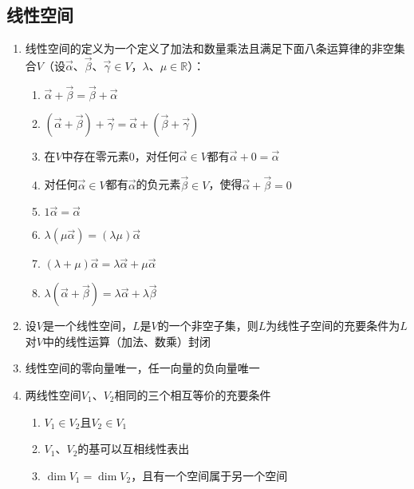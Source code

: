 \documentclass[12pt,a4paper,UTF8]{book}
\begin{document}
\subsection{线性空间}
\begin{enumerate}
\item 线性空间的定义为一个定义了加法和数量乘法且满足下面八条运算律的非空集合$V$（设$\vec{\alpha}$、$\vec{\beta}$、$\vec{\gamma}\in V$，$\lambda$、$\mu\in\mathbb{R}$）：
\begin{enumerate}
\item $\vec{\alpha}+\vec{\beta}=\vec{\beta}+\vec{\alpha}$
\item $\left(\vec{\alpha}+\vec{\beta}\right)+\vec{\gamma}=\vec{\alpha}+\left(\vec{\beta}+\vec{\gamma}\right)$
\item 在$V$中存在零元素$0$，对任何$\vec{\alpha}\in V$都有$\vec{\alpha}+0=\vec{\alpha}$
\item 对任何$\vec{\alpha}\in V$都有$\vec{\alpha}$的负元素$\vec{\beta}\in V$，使得$\vec{\alpha}+\vec{\beta}=0$
\item $1\vec{\alpha}=\vec{\alpha}$
\item $\lambda\left(\mu\vec{\alpha}\right)=\left(\lambda\mu\right)\vec{\alpha}$
\item $\left(\lambda+\mu\right)\vec{\alpha}=\lambda\vec{\alpha}+\mu\vec{\alpha}$
\item $\lambda\left(\vec{\alpha}+\vec{\beta}\right)=\lambda\vec{\alpha}+\lambda\vec{\beta}$
\end{enumerate}
\item 设$V$是一个线性空间，$L$是$V$的一个非空子集，则$L$为线性子空间的充要条件为$L$对$V$中的线性运算（加法、数乘）封闭
\item 线性空间的零向量唯一，任一向量的负向量唯一
\item 两线性空间$V_1$、$V_2$相同的三个相互等价的充要条件
\begin{enumerate}
\item $V_1\in V_2$且$V_2\in V_1$
\item $V_1$、$V_2$的基可以互相线性表出
\item $\operatorname{dim}V_1=\operatorname{dim}V_2$，且有一个空间属于另一个空间
\end{enumerate}
\end{enumerate}
\end{document}
